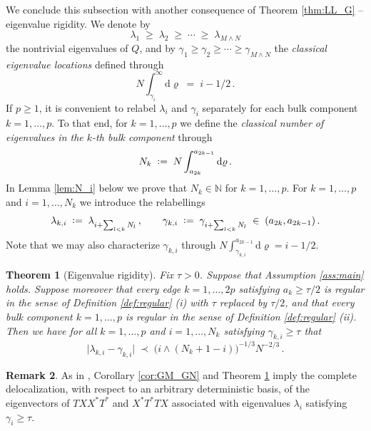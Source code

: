 \documentclass[11pt]{article} %
\numberwithin{equation}{section}
\numberwithin{figure}{section}
\theoremstyle{plain} %
\newtheorem{theorem}{Theorem}[section]
\theoremstyle{definition} %
\newtheorem{remark}[theorem]{Remark}
\newcommand{\N}{\mathbb{N}}
\newcommand{\dd}{\mathrm{d}}
\newcommand*{\deq}{\mathrel{\vcenter{\baselineskip0.65ex \lineskiplimit0pt \hbox{.}\hbox{.}}}=}
\renewcommand{\geq}{\geqslant}
\newcommand{\pb}[1]{\bigl({#1}\bigr)}
\newcommand{\abs}[1]{\lvert #1 \rvert}
\begin{document}
We conclude this subsection with another consequence of Theorem \ref{thm:LL_G} -- eigenvalue rigidity. We denote by
\begin{equation*}
\lambda_1 \;\geq\; \lambda_2 \;\geq\; \cdots \;\geq\; \lambda_{M \wedge N}
\end{equation*}
the nontrivial eigenvalues of $Q$, and by $\gamma_1 \geq \gamma_2 \geq \cdots \geq \gamma_{M \wedge N}$ the \emph{classical eigenvalue locations} defined through
\begin{equation} \label{def:gamma_alpha}
N \int_{\gamma_i}^\infty \dd \varrho \;=\; i-1/2\,.
\end{equation}
If $p \geq 1$, it is convenient to relabel $\lambda_i$ and $\gamma_i$ separately for each bulk component $k = 1, \dots, p$. To that end, for $k = 1, \dots, p$ we define the \emph{classical number of eigenvalues in the $k$-th bulk component} through
\begin{equation} \label{def_N_k}
N_k \;\deq\; N \int_{a_{2k}}^{a_{2k - 1}} \dd \varrho\,.
\end{equation}
In Lemma \ref{lem:N_i} below we prove that $N_k \in \N$ for $k = 1, \dots, p$. For $k = 1, \dots, p$ and $i = 1, \dots, N_k$ we introduce the relabellings
\begin{equation*}
\lambda_{k,i} \;\deq\; \lambda_{i + \sum_{l < k} N_l}\,, \qquad \gamma_{k,i} \;\deq\; \gamma_{i + \sum_{l < k} N_l} \;\in\; (a_{2k}, a_{2k - 1})\,.
\end{equation*}
Note that we may also characterize $\gamma_{k,i}$ through $N \int_{\gamma_{k,i}}^{a_{2k-1}} \dd \varrho = i-1/2$.



\begin{theorem}[Eigenvalue rigidity] \label{thm:rigidity}
Fix $\tau > 0$. Suppose that Assumption \ref{ass:main} holds. Suppose moreover that every edge $k = 1, \dots, 2p$ satisfying $a_k \geq \tau/2$ is regular in the sense of Definition \ref{def:regular} (i) with $\tau$ replaced by $\tau/2$, and that every bulk component $k = 1, \dots, p$ is regular in the sense of Definition \ref{def:regular} (ii). Then we have for all $k = 1, \dots, p$ and $i = 1, \dots, N_k$ satisfying $\gamma_{k,i} \geq \tau$ that
\begin{equation} \label{rigidity}
\abs{\lambda_{k,i} - \gamma_{k,i}} \;\prec\; \pb{i \wedge (N_k + 1 - i)}^{-1/3} N^{-2/3}\,.
\end{equation}
\end{theorem}

\begin{remark}
As in \cite[Theorem 2.8]{BEKYY}, Corollary \ref{cor:GM_GN} and Theorem \ref{thm:rigidity} imply the complete delocalization, with respect to an arbitrary deterministic basis, of the eigenvectors of $TXX^*T^*$ and $X^* T^* T X$ associated with eigenvalues $\lambda_i$ satisfying $\gamma_i \geq \tau$.
\end{remark}
\end{document}
